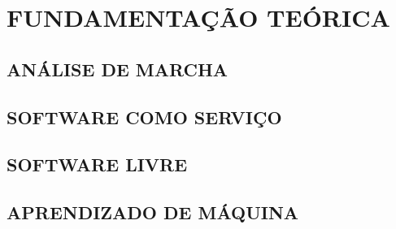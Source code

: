 \chapter[FUNDAMENTAÇÃO TEÓRICA]{\textbf {FUNDAMENTAÇÃO TEÓRICA}}

\section{ANÁLISE DE MARCHA}

\section{SOFTWARE COMO SERVIÇO}
\section{SOFTWARE LIVRE} 
\section{APRENDIZADO DE MÁQUINA}


\begin{comment}

\end{comment}
